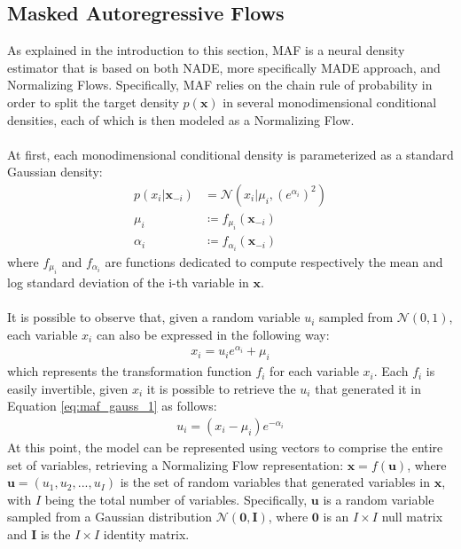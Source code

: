         \subsection{Masked Autoregressive Flows}
        \label{sub:maf}
            As explained in the introduction to this section, MAF is a neural density estimator that is based on both NADE, more specifically MADE approach, and Normalizing Flows. Specifically, MAF relies on the chain rule of probability in order to split the target density $p(\mathbf{x})$ in several monodimensional conditional densities, each of which is then modeled as a Normalizing Flow.
            \\\\
            At first, each monodimensional conditional density is parameterized as a standard Gaussian density:
            \begin{align}
                p(x_i | \mathbf{x}_{-i} ) &= \mathcal{N} \left(x_i | \mu_i, (e^{\alpha_i})^2 \right)\label{eq:maf_gauss_1}\\
                \mu_i &\coloneqq f_{\mu_i}(\mathbf{x}_{-i})\nonumber\\
                \alpha_i &\coloneqq f_{\alpha_i}(\mathbf{x}_{-i})\nonumber
            \end{align}
            where $f_{\mu_i}$ and $f_{\alpha_i}$ are functions dedicated to compute respectively the mean and log standard deviation of the i-th variable in $\mathbf{x}$.
            \\\\
            It is possible to observe that, given a random variable $u_i$ sampled from $\mathcal{N}(0,1)$, each variable $x_i$ can also be expressed in the following way:
            \begin{align}
            \label{eq:maf_gauss_2}
                x_i = u_i e^{\alpha_i} + \mu_i
            \end{align}
            which represents the transformation function $f_i$  for each variable $x_i$. Each $f_i$ is easily invertible, given $x_i$ it is possible to retrieve the $u_i$ that generated it in Equation \ref{eq:maf_gauss_1} as follows:
            \begin{align}
                u_i = (x_i - \mu_i)e^{-\alpha_i}
            \end{align}
            At this point, the model can be represented using vectors to comprise the entire set of variables, retrieving a Normalizing Flow representation: $\mathbf{x} = f(\mathbf{u})$, where $\mathbf{u} = (u_1, u_2, ..., u_I)$ is the set of random variables that generated variables in $\mathbf{x}$, with $I$ being the total number of variables. Specifically, $\mathbf{u}$ is a random variable sampled from a Gaussian distribution $\mathcal{N}(\mathbf{0},\mathbf{I})$, where $\mathbf{0}$ is an $I \times I$ null matrix and $\mathbf{I}$ is the $I \times I$ identity matrix.
